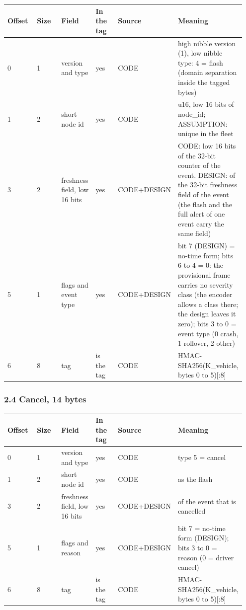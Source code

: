 {\scriptsize\raggedright
\begin{longtable}{p{0.158\linewidth}p{0.158\linewidth}p{0.158\linewidth}p{0.158\linewidth}p{0.158\linewidth}p{0.158\linewidth}}
\toprule
Offset & Size & Field & In the tag & Source & Meaning \\
\midrule
\endhead
0 & 1 & version and type & yes & CODE & high nibble version (1), low nibble type: 4 = flash (domain separation inside the tagged bytes) \\
1 & 2 & short node id & yes & CODE & u16, low 16 bits of node\_id; ASSUMPTION: unique in the fleet \\
3 & 2 & freshness field, low 16 bits & yes & CODE+DESIGN & CODE: low 16 bits of the 32-bit counter of the event. DESIGN: of the 32-bit freshness field of the event (the flash and the full alert of one event carry the same field) \\
5 & 1 & flags and event type & yes & CODE+DESIGN & bit 7 (DESIGN) = no-time form; bits 6 to 4 = 0: the provisional frame carries no severity class (the encoder allows a class there; the design leaves it zero); bits 3 to 0 = event type (0 crash, 1 rollover, 2 other) \\
6 & 8 & tag & is the tag & CODE & HMAC-SHA256(K\_vehicle, bytes 0 to 5)[:8] \\
\bottomrule
\end{longtable}}

\subsubsection*{2.4 Cancel, 14 bytes}

{\scriptsize\raggedright
\begin{longtable}{p{0.158\linewidth}p{0.158\linewidth}p{0.158\linewidth}p{0.158\linewidth}p{0.158\linewidth}p{0.158\linewidth}}
\toprule
Offset & Size & Field & In the tag & Source & Meaning \\
\midrule
\endhead
0 & 1 & version and type & yes & CODE & type 5 = cancel \\
1 & 2 & short node id & yes & CODE & as the flash \\
3 & 2 & freshness field, low 16 bits & yes & CODE+DESIGN & of the event that is cancelled \\
5 & 1 & flags and reason & yes & CODE+DESIGN & bit 7 = no-time form (DESIGN); bits 3 to 0 = reason (0 = driver cancel) \\
6 & 8 & tag & is the tag & CODE & HMAC-SHA256(K\_vehicle, bytes 0 to 5)[:8] \\
\bottomrule
\end{longtable}}

